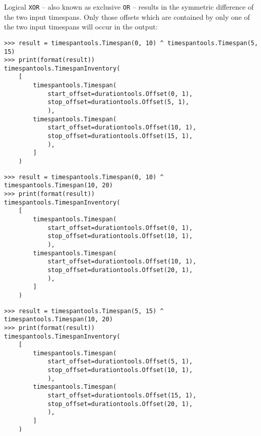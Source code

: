 \noindent Logical \texttt{XOR} -- also known as exclusive \texttt{OR} --
results in the symmetric difference of the two input timespans. Only those
offsets which are contained by only one of the two input timespans will occur
in the output:

\begin{comment}
<abjad>
result = timespantools.Timespan(0, 10) ^ timespantools.Timespan(5, 15)
print(format(result))
result = timespantools.Timespan(0, 10) ^ timespantools.Timespan(10, 20)
print(format(result))
result = timespantools.Timespan(5, 15) ^ timespantools.Timespan(10, 20)
print(format(result))
</abjad>
\end{comment}

\begin{singlespacing}
\vspace{-0.5\baselineskip}
\begin{lstlisting}
>>> result = timespantools.Timespan(0, 10) ^ timespantools.Timespan(5, 15)
>>> print(format(result))
timespantools.TimespanInventory(
    [
        timespantools.Timespan(
            start_offset=durationtools.Offset(0, 1),
            stop_offset=durationtools.Offset(5, 1),
            ),
        timespantools.Timespan(
            start_offset=durationtools.Offset(10, 1),
            stop_offset=durationtools.Offset(15, 1),
            ),
        ]
    )
\end{lstlisting}
\begin{lstlisting}
>>> result = timespantools.Timespan(0, 10) ^ timespantools.Timespan(10, 20)
>>> print(format(result))
timespantools.TimespanInventory(
    [
        timespantools.Timespan(
            start_offset=durationtools.Offset(0, 1),
            stop_offset=durationtools.Offset(10, 1),
            ),
        timespantools.Timespan(
            start_offset=durationtools.Offset(10, 1),
            stop_offset=durationtools.Offset(20, 1),
            ),
        ]
    )
\end{lstlisting}
\begin{lstlisting}
>>> result = timespantools.Timespan(5, 15) ^ timespantools.Timespan(10, 20)
>>> print(format(result))
timespantools.TimespanInventory(
    [
        timespantools.Timespan(
            start_offset=durationtools.Offset(5, 1),
            stop_offset=durationtools.Offset(10, 1),
            ),
        timespantools.Timespan(
            start_offset=durationtools.Offset(15, 1),
            stop_offset=durationtools.Offset(20, 1),
            ),
        ]
    )
\end{lstlisting}
\end{singlespacing}

